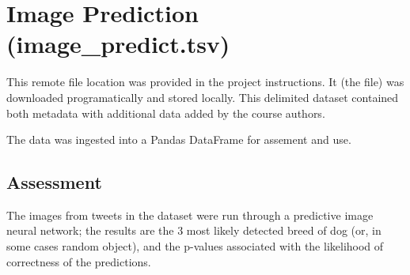 \documentclass{report}
\begin{document}
\section{Image Prediction (\textbf{image\_predict.tsv})}

This remote file location was provided in the project instructions.  It (the file) was downloaded programatically and stored locally. 
This delimited dataset contained both metadata with additional data added by the course authors. 

The data was ingested into a Pandas DataFrame for assement and use.

	\subsection{Assessment}
	The images from tweets in the dataset were run through a predictive image neural network; 
	the results are the 3 most likely detected breed of dog (or, in some cases random object), and the p-values associated with the likelihood of correctness of the predictions.

			
\end{document}
